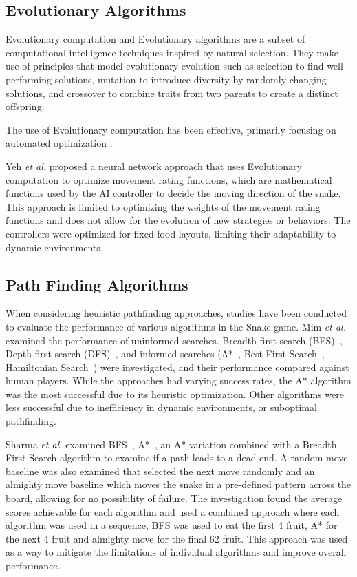 \documentclass[a4paper,12pt]{article}
\begin{document}
\subsection{Evolutionary Algorithms}
Evolutionary computation and Evolutionary algorithms are a subset of computational intelligence techniques inspired by natural selection.
They make use of principles that model evolutionary evolution such as selection to find well-performing solutions, mutation to introduce 
diversity by randomly changing solutions, and crossover to combine traits from two parents to create a distinct offspring. \cite{EA2}

The use of Evolutionary computation has been effective, primarily focusing on automated optimization \cite{EA2}.

Yeh \textit{et al.} \cite{EA2} proposed a neural network approach that uses Evolutionary computation to optimize movement rating functions,
which are mathematical functions used by the AI controller to decide the moving direction of the snake. 
This approach is limited to optimizing the weights of the movement rating functions and does not allow for the evolution of new strategies or behaviors.
The controllers were optimized for fixed food layouts, limiting their adaptability to dynamic environments.

\subsection{Path Finding Algorithms}
When considering heuristic pathfinding approaches, studies have been conducted to evaluate the performance of various algorithms in the Snake game.
Mim \textit{et al.} \cite{Heuristic3} examined the performance of uninformed searches.
Breadth first search (BFS)~\cite{BreadthFirstSearch}, Depth first search (DFS)~\cite{DepthFirstSearch},
and informed searches (A*~\cite{A}, Best-First Search~\cite{Best}, Hamiltonian Search~\cite{Ham}) were investigated, and their performance compared against human players.
While the approaches had varying success rates, the A* algorithm was the most successful due to its heuristic optimization.
Other algorithms were less successful due to inefficiency in dynamic environments, or suboptimal pathfinding.

Sharma \textit{et al.} \cite{Heuristic2} examined BFS~\cite{BreadthFirstSearch}, A*~\cite{A}, an
A* variation combined with a Breadth First Search algorithm to examine if a path leads to a dead end.
A random move baseline was also examined that selected the next move randomly and an almighty move baseline which moves the snake in a pre-defined pattern across the board, allowing for no possibility of failure.
The investigation found the average scores achievable for each algorithm and used a combined approach where each algorithm was used in a sequence, 
BFS was used to eat the first 4 fruit, A* for the next 4 fruit and almighty move for the final 62 fruit. This approach was used as a way to mitigate
the limitations of individual algorithms and improve overall performance.
\end{document}
